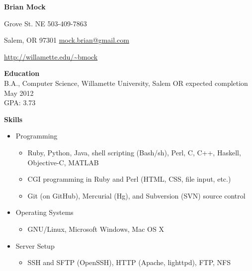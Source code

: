 \documentclass[10pt]{article}
\begin{document}
\noindent
\begin{center}
\textbf{\Large Brian Mock}
\end{center}

 Grove St. NE
\hfill
503-409-7863

\noindent
Salem, OR 97301
\hfill
\url{mock.brian@gmail.com}

\noindent
\hfill
\url{http://willamette.edu/~bmock}

\bigskip
\smallskip

\medskip
\noindent \textbf{Education} \hrulefill \\
\hangindent=24pt
B.A., Computer Science, Willamette University, Salem OR expected completion
May 2012 \\
GPA: 3.73

\noindent \textbf{Skills} \hrulefill
\begin{itemize}
\item Programming
    \begin{itemize}
    \item Ruby, Python, Java, shell scripting (Bash/sh), Perl, C, C++,
    Haskell, Objective-C, MATLAB
    \item CGI programming in Ruby and Perl (HTML, CSS, file input, etc.)
    \item Git (on GitHub), Mercurial (Hg), and Subversion (SVN) source control
    \end{itemize}
\item Operating Systems
    \begin{itemize}
    \item GNU/Linux, Microsoft Windows, Mac OS X
    \end{itemize}
\item Server Setup
    \begin{itemize}
    \item SSH and SFTP (OpenSSH), HTTP (Apache, lighttpd), FTP, NFS
    \end{itemize}
\end{itemize}
\end{document}
